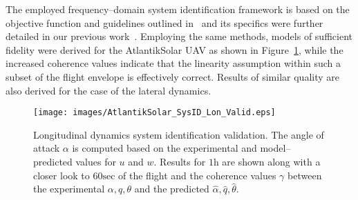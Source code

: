 The employed frequency--domain system identification framework is based on the objective function and guidelines outlined in~\cite{TISCHLER_BOOK} and its specifics were further detailed in our previous work~\cite{Oettershagen_MED14_L1MPC}. Employing the same methods, models of sufficient fidelity were derived for the AtlantikSolar UAV as shown in Figure~\ref{SysID_LonValid}, while the increased coherence values indicate that the linearity assumption within such a subset of the flight envelope is effectively correct. Results of similar quality are also derived for the case of the lateral dynamics. 

%
\begin{figure}[htbp]
\centering
  \texttt{[image: images/AtlantikSolar\_SysID\_Lon\_Valid.eps]}
\caption{Longitudinal dynamics system identification validation. The angle of attack $\alpha$ is computed based on the experimental and model--predicted values for $u$ and $w$. Results for $1\textrm{h}$ are shown along with a closer look to $60\textrm{sec}$ of the flight and the coherence values $\gamma$ between the experimental $\alpha,q,\theta$ and the predicted $\hat{\alpha},\hat{q},\hat{\theta}$. }
\label{SysID_LonValid}
\end{figure}
% 